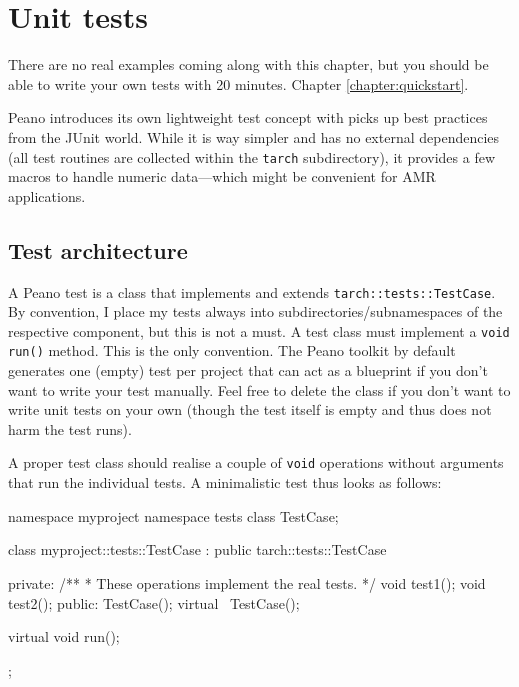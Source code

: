\section{Unit tests}
\label{section:test}



\chapterDescription
  {
    There are no real examples coming along with this chapter, but you should be
    able to write your own tests with 20 minutes.
  }
  {
    Chapter \ref{chapter:quickstart}.
  }

Peano introduces its own lightweight test concept with picks up best practices
from the JUnit world. 
While it is way simpler and has no external dependencies (all test routines are
collected within the \texttt{tarch} subdirectory), it provides a few macros to
handle numeric data---which might be convenient for AMR applications.

\subsection{Test architecture}

A Peano test is a class that implements and extends
\texttt{tarch::tests::TestCase}.
By convention, I place my tests always into subdirectories/subnamespaces of the
respective component, but this is not a must.
A test class must implement a \texttt{void run()} method.
This is the only convention. 
The Peano toolkit by default generates one (empty) test per project that can act
as a blueprint if you don't want to write your test manually. 
Feel free to delete the class if you don't want to write unit tests on your own
(though the test itself is empty and thus does not harm the test runs).

A proper test class should realise a couple of \texttt{void} operations without
arguments that run the individual tests.
A minimalistic test thus looks as follows:

\begin{code}
namespace myproject {
  namespace tests {
    class TestCase;
  }
}

class myproject::tests::TestCase : public tarch::tests::TestCase {
 private:
  /**
   * These operations implement the real tests.
   */
  void test1();
  void test2();
 public:
  TestCase();
  virtual ~TestCase();

  virtual void run();
};
\end{code}


